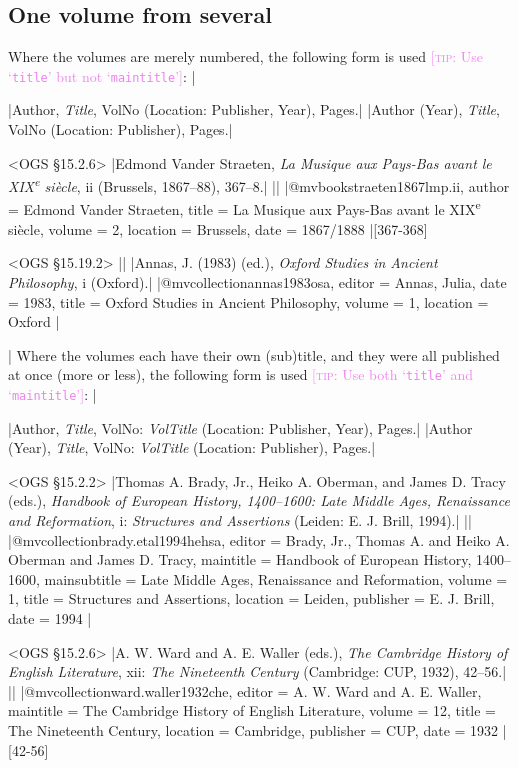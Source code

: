 \documentclass[extrafontsizes,11pt,a4paper,oneside]{memoir}
\newcommand*{\code}[1]{`\texttt{#1}'}
\newcommand*{\aside}[1]{\textcolor{violet}{[\textsc{tip:} #1]}}
\begin{document}
\subsection{One volume from several}

Where the volumes are merely numbered, the following form is used
\aside{Use \code{title} but not \code{maintitle}}:
|

\specs
|Author, \emph{Title}, VolNo (Location: Publisher, Year), Pages.|%
|Author (Year), \emph{Title}, VolNo (Location: Publisher), Pages.|

\bibexample<OGS \S15.2.6>
|Edmond Vander Straeten, \emph{La Musique aux Pays-Bas avant le XIX\textsuperscript{e} siècle}, ii (Brussels, 1867--88), 367--8.|%
||%
|@mvbook{straeten1867lmp.ii,
  author = {Edmond {Vander Straeten}},
  title = {La Musique aux Pays-Bas avant le XIX\textsuperscript{e} siècle},
  volume = {2},
  location = {Brussels},
  date = {1867/1888}
}|[367-368]

\bibexample<OGS \S15.19.2>
||%
|Annas, J. (1983) (ed.), \emph{Oxford Studies in Ancient Philosophy}, i (Oxford).|%
|@mvcollection{annas1983osa,
  editor = {Annas, Julia},
  date = {1983},
  title = {Oxford Studies in Ancient Philosophy},
  volume = {1},
  location = {Oxford}
}|

\todoc|
Where the volumes each have their own (sub)title,
and they were all published at once (more or less),
the following form is used \aside{Use both \code{title} and \code{maintitle}}:
|

\specs
|Author, \emph{Title}, VolNo: \emph{VolTitle} (Location: Publisher, Year), Pages.|%
|Author (Year), \emph{Title}, VolNo: \emph{VolTitle} (Location: Publisher), Pages.|

\bibexample<OGS \S15.2.2>
|Thomas A. Brady, Jr., Heiko A. Oberman, and James D. Tracy (eds.), \emph{Handbook of European History, 1400–1600: Late Middle Ages, Renaissance and Reformation}, i: \emph{Structures and Assertions} (Leiden: E. J. Brill, 1994).|%
||%
|@mvcollection{brady.etal1994hehsa,
  editor = {Brady, Jr., Thomas A. and Heiko A. Oberman and James D. Tracy},
  maintitle = {Handbook of European History, 1400–1600},
  mainsubtitle = {{Late} {Middle} {Ages,} {Renaissance} and {Reformation}},
  volume = {1},
  title = {Structures and Assertions},
  location = {Leiden},
  publisher = {E. J. Brill},
  date = {1994}
}|

\bibexample<OGS \S15.2.6>
|A. W. Ward and A. E. Waller (eds.), \emph{The Cambridge History of English Literature}, xii: \emph{The Nineteenth Century} (Cambridge: CUP, 1932), 42--56.|%
||%
|@mvcollection{ward.waller1932che,
  editor = {A. W. Ward and A. E. Waller},
  maintitle = {The Cambridge History of English Literature},
  volume = {12},
  title = {The Nineteenth Century},
  location = {Cambridge},
  publisher = {CUP},
  date = {1932}
}|[42-56]
\end{document}
